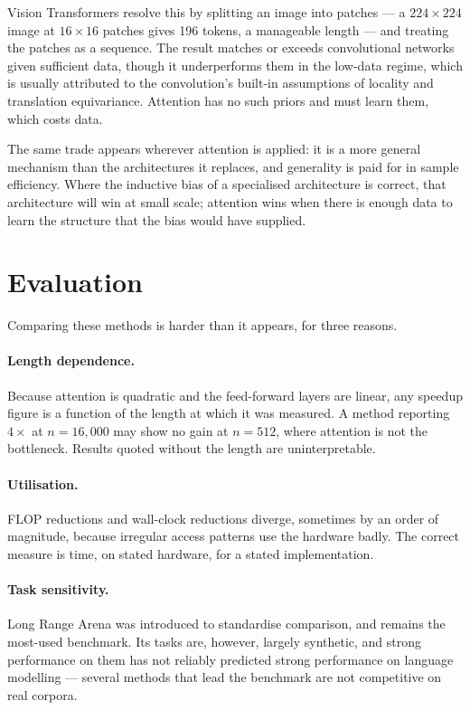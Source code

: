 \documentclass[11pt,a4paper]{article}
\begin{document}
Vision Transformers resolve this by splitting an image into patches --- a
$224 \times 224$ image at $16 \times 16$ patches gives 196 tokens, a
manageable length --- and treating the patches as a sequence. The result
matches or exceeds convolutional networks given sufficient data, though it
underperforms them in the low-data regime, which is usually attributed to the
convolution's built-in assumptions of locality and translation equivariance.
Attention has no such priors and must learn them, which costs data.

The same trade appears wherever attention is applied: it is a more general
mechanism than the architectures it replaces, and generality is paid for in
sample efficiency. Where the inductive bias of a specialised architecture is
correct, that architecture will win at small scale; attention wins when there
is enough data to learn the structure that the bias would have supplied.

\section{Evaluation}
\label{sec:evaluation}

Comparing these methods is harder than it appears, for three reasons.

\paragraph{Length dependence.}
Because attention is quadratic and the feed-forward layers are linear, any
speedup figure is a function of the length at which it was measured. A method
reporting $4\times$ at $n = 16{,}000$ may show no gain at $n = 512$, where
attention is not the bottleneck. Results quoted without the length are
uninterpretable.

\paragraph{Utilisation.}
FLOP reductions and wall-clock reductions diverge, sometimes by an order of
magnitude, because irregular access patterns use the hardware badly. The
correct measure is time, on stated hardware, for a stated implementation.

\paragraph{Task sensitivity.}
Long Range Arena \cite{tay2022} was introduced to standardise comparison, and
remains the most-used benchmark. Its tasks are, however, largely synthetic,
and strong performance on them has not reliably predicted strong performance
on language modelling --- several methods that lead the benchmark are not
competitive on real corpora.
\end{document}

